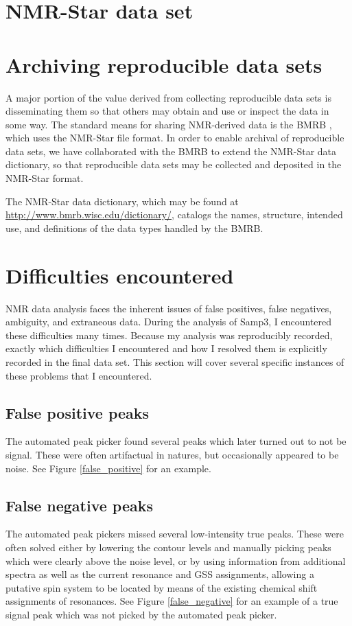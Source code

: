 \section{NMR-Star data set}


\section{Archiving reproducible data sets}
A major portion of the value derived from collecting reproducible data sets
is disseminating them so that others may obtain and use or inspect the data
in some way.  The standard means for sharing NMR-derived data is the BMRB
\cite{bmrb}, which uses the NMR-Star file format.  In order to enable archival
of reproducible data sets, we have collaborated with the BMRB to extend the
NMR-Star data dictionary, so that reproducible data sets may be collected and
deposited in the NMR-Star format.

The NMR-Star data dictionary, which may be found at 
\url{http://www.bmrb.wisc.edu/dictionary/}, catalogs the names, structure,
intended use, and definitions of the data types handled by the BMRB.


\section{Difficulties encountered}

NMR data analysis faces the inherent issues of false positives, false 
negatives, ambiguity, and extraneous data.
During the analysis of Samp3, I encountered these difficulties many times.  
Because my analysis was reproducibly recorded, exactly which
difficulties I encountered and how I resolved them is explicitly recorded
in the final data set.  This section will cover several specific instances 
of these problems that I encountered.

\subsection{False positive peaks}
The automated peak picker found several peaks which later turned out to
not be signal.  These were often artifactual in natures, but occasionally 
appeared to be noise.  See Figure \ref{false_positive} for an example.

\subsection{False negative peaks}
The automated peak pickers missed several low-intensity true peaks.
These were often solved either by lowering the contour levels and manually
picking peaks which were clearly above the noise level, or by using 
information from additional spectra as well as the current resonance and 
GSS assignments, allowing a putative spin system to be located by means of
the existing chemical shift assignments of resonances.
See Figure \ref{false_negative} for an example of a true signal peak which
was not picked by the automated peak picker.

